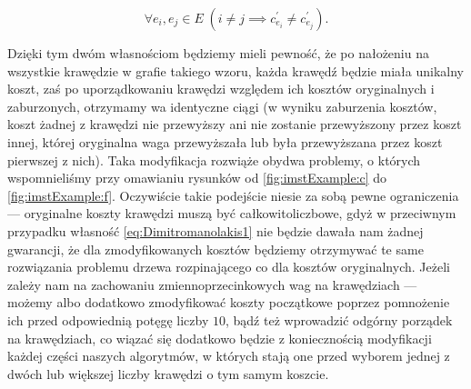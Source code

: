 {\begin{equation}\label{eq:Dimitromanolakis2}
	\forall e_{i}, e_{j} \in E \; \left( i \neq j \implies c^{\prime}_{e_{i}} \neq c^{\prime}_{e_{j}} \right)\text{.}
\end{equation}

Dzięki tym dwóm własnościom będziemy mieli pewność, że po nałożeniu na wszystkie krawędzie w grafie takiego wzoru, każda krawędź będzie miała unikalny koszt, zaś po uporządkowaniu krawędzi względem ich kosztów oryginalnych i zaburzonych, otrzymamy wa identyczne ciągi (w wyniku zaburzenia kosztów, koszt żadnej z krawędzi nie przewyższy ani nie zostanie przewyższony przez koszt innej, której oryginalna waga przewyższała lub była przewyższana przez koszt pierwszej z nich). Taka modyfikacja rozwiąże obydwa problemy, o których wspomnieliśmy przy omawianiu rysunków od \ref{fig:imstExample:c} do \ref{fig:imstExample:f}. Oczywiście takie podejście niesie za sobą pewne ograniczenia --- oryginalne koszty krawędzi muszą być całkowitoliczbowe, gdyż w przeciwnym przypadku własność \ref{eq:Dimitromanolakis1} nie będzie dawała nam żadnej gwarancji, że dla zmodyfikowanych kosztów będziemy otrzymywać te same rozwiązania problemu drzewa rozpinającego co dla kosztów oryginalnych. Jeżeli zależy nam na zachowaniu zmiennoprzecinkowych wag na krawędziach --- możemy albo dodatkowo zmodyfikować koszty początkowe poprzez pomnożenie ich przed odpowiednią potęgę liczby $10$, bądź też wprowadzić odgórny porządek na krawędziach, co wiązać się dodatkowo będzie z koniecznością modyfikacji każdej części naszych algorytmów, w których stają one przed wyborem jednej z dwóch lub większej liczby krawędzi o tym samym koszcie.

}
